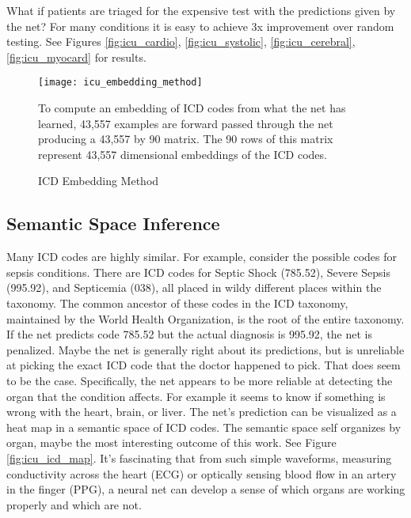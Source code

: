 What if patients are triaged for the expensive test with the predictions given by the net?  For many conditions it is easy to achieve 3x improvement over random testing.  See Figures \ref{fig:icu_cardio}, \ref{fig:icu_systolic}, \ref{fig:icu_cerebral}, \ref{fig:icu_myocard} for results.

\pagebreak
\begin{figure}[h]
\begin{center}
\texttt{[image: icu\_embedding\_method]}
\end{center}
\caption{ICD Embedding Method}
\vspace{12px}
To compute an embedding of ICD codes from what the net has learned, 43,557 examples are forward passed through the net producing a 43,557 by 90 matrix.  The 90 rows of this matrix represent 43,557 dimensional embeddings of the ICD codes.
\label{fig:icu_embedding_method}
\end{figure}

\subsection{Semantic Space Inference}

Many ICD codes are highly similar.  For example, consider the possible codes for sepsis conditions.  There are ICD codes for Septic Shock (785.52), Severe Sepsis (995.92), and Septicemia (038), all placed in wildy different places within the taxonomy.  The common ancestor of these codes in the ICD taxonomy, maintained by the World Health Organization, is the root of the entire taxonomy.  If the net predicts code 785.52 but the actual diagnosis is 995.92, the net is penalized.  Maybe the net is generally right about its predictions, but is unreliable at picking the exact ICD code that the doctor happened to pick.  That does seem to be the case.  Specifically, the net appears to be more reliable at detecting the organ that the condition affects.  For example it seems to know if something is wrong with the heart, brain, or liver.  The net's prediction can be visualized as a heat map in a semantic space of ICD codes.  The semantic space self organizes by organ, maybe the most interesting outcome of this work.  See Figure \ref{fig:icu_icd_map}.  It's fascinating that from such simple waveforms, measuring conductivity across the heart (ECG) or optically sensing blood flow in an artery in the finger (PPG), a neural net can develop a sense of which organs are working properly and which are not.

